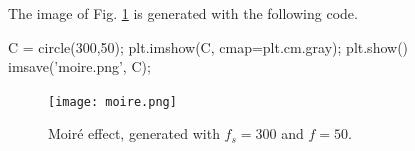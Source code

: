 The image of Fig. \ref{fig:introduction:python:aliasing} is generated with the following code.

\begin{python}
C = circle(300,50);
plt.imshow(C, cmap=plt.cm.gray);
plt.show()
imsave('moire.png', C);
\end{python}

\begin{figure}[H]
 \centering\caption{Moiré effect, generated with $f_s=300$ and $f=50$.}%
 \vspace*{-2pt}%
 \texttt{[image: moire.png]}%
 \vspace*{-10pt}%
 \label{fig:introduction:python:aliasing}%
\end{figure}

